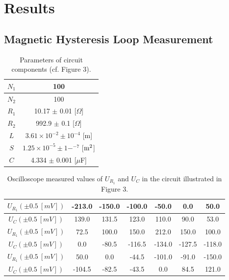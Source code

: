\documentclass{article}
\begin{document}
\section{Results}

\subsection{Magnetic Hysteresis Loop Measurement}

\begin{table}[!h]
\begin{center}
\begin{tabular}{|c|c|}
\hline
$N_1$	&	100\\
\hline
$N_2$	&	100\\
\hline
$R_1$	&	10.17 $\pm$ 0.01 [$\Omega$]\\
\hline
$R_2$	&	992.9 $\pm$ 0.1 [$\Omega$]\\
\hline
$L$		&	$3.61\times10^{-2}\pm10^{-4}$ [m]\\
\hline
$S$		&	$1.25\times10^{-5}\pm1-^{-7}$ [$\rm m^2$]\\
\hline
$C$		&	4.334 $\pm$ 0.001 [$\mu$F]\\
\hline
\end{tabular}
\caption{Parameters of circuit components (cf. Figure 3).}
\label{tab-1}
\end{center}
\end{table}

\begin{table}[!h]
\begin{center}
\begin{tabular}{|c|c|c|c|c|c|c|}
\hline
$U_{R_1}(\pm0.5\ [mV])$	&	-213.0	&	-150.0	&	-100.0	&   -50.0	&	 0.0	&	 50.0	\\
\hline
$U_{C}(\pm0.5\ [mV])$	& 	 139.0 	&	 131.5 	&	 123.0	&	 110.0	&	 90.0	&	 53.0	\\
\hline
$U_{R_1}(\pm0.5\ [mV])$	&	 72.5	&	 100.0	&	 150.0	&	 212.0	&	 150.0	&	 100.0	\\
\hline
$U_{C}(\pm0.5\ [mV])$	&	 0.0	&	-80.5	&	-116.5	&   -134.0	&	-127.5	&	-118.0	\\
\hline
$U_{R_1}(\pm0.5\ [mV])$	&	 50.0	&	 0.0	&	-44.5	&	-101.0	&	-91.0	&	-150.0	\\
\hline
$U_{C}(\pm0.5\ [mV])$	&	-104.5	&	-82.5	&	-43.5	&	 0.0	&	 84.5	&	 121.0	\\
\hline
\end{tabular}
\caption{Oscilloscope measured values of $U_{R_1}$ and $U_C$ in the circuit illustrated in Figure 3.}
\label{tab-2}
\end{center}
\end{table}
\end{document}
